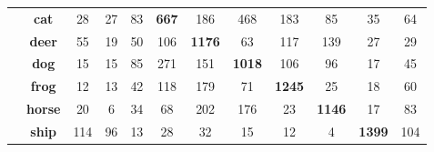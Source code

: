 \documentclass{VUMIFPSbakalaurinis}
\begin{document}
\begin{table}[]
{{\begin{tabular}{|cc|cccccccccc|}
        \multicolumn{1}{|c|}{}                                             & \textbf{cat}        & \multicolumn{1}{c|}{28}                & \multicolumn{1}{c|}{27}                  & \multicolumn{1}{c|}{83}            & \multicolumn{1}{c|}{\textbf{667}} & \multicolumn{1}{c|}{186}           & \multicolumn{1}{c|}{468}           & \multicolumn{1}{c|}{183}           & \multicolumn{1}{c|}{85}             & \multicolumn{1}{c|}{35}            & 64             \\ \cline{2-12} 
        \multicolumn{1}{|c|}{}                                             & \textbf{deer}       & \multicolumn{1}{c|}{55}                & \multicolumn{1}{c|}{19}                  & \multicolumn{1}{c|}{50}            & \multicolumn{1}{c|}{106}          & \multicolumn{1}{c|}{\textbf{1176}} & \multicolumn{1}{c|}{63}            & \multicolumn{1}{c|}{117}           & \multicolumn{1}{c|}{139}            & \multicolumn{1}{c|}{27}            & 29             \\ \cline{2-12} 
        \multicolumn{1}{|c|}{}                                             & \textbf{dog}        & \multicolumn{1}{c|}{15}                & \multicolumn{1}{c|}{15}                  & \multicolumn{1}{c|}{85}            & \multicolumn{1}{c|}{271}          & \multicolumn{1}{c|}{151}           & \multicolumn{1}{c|}{\textbf{1018}} & \multicolumn{1}{c|}{106}           & \multicolumn{1}{c|}{96}             & \multicolumn{1}{c|}{17}            & 45             \\ \cline{2-12} 
        \multicolumn{1}{|c|}{}                                             & \textbf{frog}       & \multicolumn{1}{c|}{12}                & \multicolumn{1}{c|}{13}                  & \multicolumn{1}{c|}{42}            & \multicolumn{1}{c|}{118}          & \multicolumn{1}{c|}{179}           & \multicolumn{1}{c|}{71}            & \multicolumn{1}{c|}{\textbf{1245}} & \multicolumn{1}{c|}{25}             & \multicolumn{1}{c|}{18}            & 60             \\ \cline{2-12} 
        \multicolumn{1}{|c|}{}                                             & \textbf{horse}      & \multicolumn{1}{c|}{20}                & \multicolumn{1}{c|}{6}                   & \multicolumn{1}{c|}{34}            & \multicolumn{1}{c|}{68}           & \multicolumn{1}{c|}{202}           & \multicolumn{1}{c|}{176}           & \multicolumn{1}{c|}{23}            & \multicolumn{1}{c|}{\textbf{1146}}  & \multicolumn{1}{c|}{17}            & 83             \\ \cline{2-12} 
        \multicolumn{1}{|c|}{}                                             & \textbf{ship}       & \multicolumn{1}{c|}{114}               & \multicolumn{1}{c|}{96}                  & \multicolumn{1}{c|}{13}            & \multicolumn{1}{c|}{28}           & \multicolumn{1}{c|}{32}            & \multicolumn{1}{c|}{15}            & \multicolumn{1}{c|}{12}            & \multicolumn{1}{c|}{4}              & \multicolumn{1}{c|}{\textbf{1399}} & 104            \\ \cline{2-12} 

\end{tabular}}}
\end{table}
\end{document}
